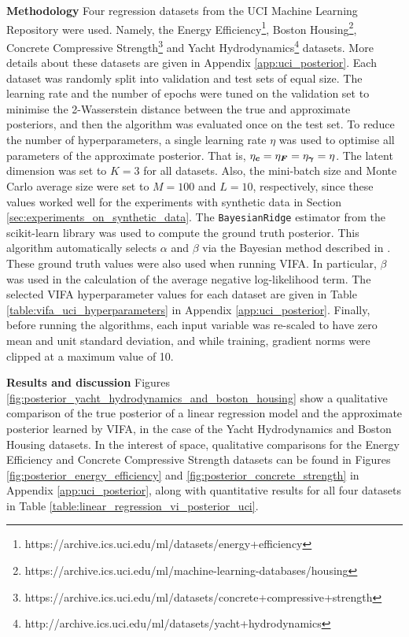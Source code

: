 \documentclass[10pt]{article} %
\newcommand{\vgamma}{\bm{\gamma}}
\begin{document}
\textbf{Methodology}  Four regression datasets from the UCI Machine Learning Repository \citep{dua2019} were used. Namely, the Energy Efficiency\footnote{https://archive.ics.uci.edu/ml/datasets/energy+efficiency}, Boston Housing\footnote{https://archive.ics.uci.edu/ml/machine-learning-databases/housing}, Concrete Compressive Strength\footnote{https://archive.ics.uci.edu/ml/datasets/concrete+compressive+strength} and Yacht Hydrodynamics\footnote{http://archive.ics.uci.edu/ml/datasets/yacht+hydrodynamics} datasets. More details about these datasets are given in Appendix \ref{app:uci_posterior}.  Each dataset was randomly split into validation and test sets of equal size. The learning rate and the number of epochs were tuned on the validation set to minimise the 2-Wasserstein distance between the true and approximate posteriors, and then the algorithm was evaluated once on the test set. To reduce the number of hyperparameters, a single learning rate $\eta$ was used to optimise all parameters of the approximate posterior. That is, $\eta_\vc = \eta_\mF = \eta_{\vgamma} = \eta$. The latent dimension was set to $K=3$ for all datasets. Also, the mini-batch size and Monte Carlo average size were set to $M=100$ and $L=10$, respectively, since these values worked well for the experiments with synthetic data in Section \ref{sec:experiments_on_synthetic_data}. The \texttt{BayesianRidge} estimator from the scikit-learn library \citep{pedregosa2012} was used to compute the ground truth posterior. This algorithm automatically selects $\alpha$ and $\beta$ via the Bayesian method described in \citep{mackay1992}. These ground truth values were also used when running VIFA. In particular, $\beta$ was used in the calculation of the average negative log-likelihood term. The selected VIFA hyperparameter values for each dataset are given in Table \ref{table:vifa_uci_hyperparameters} in Appendix \ref{app:uci_posterior}. Finally, before running the algorithms, each input variable was re-scaled to have zero mean and unit standard deviation, and while training, gradient norms were clipped at a maximum value of 10. 


\textbf{Results and discussion}
Figures \ref{fig:posterior_yacht_hydrodynamics_and_boston_housing} show a qualitative comparison of the true posterior of a linear regression model and the approximate posterior learned by VIFA, in the case of the Yacht Hydrodynamics and Boston Housing datasets. In the interest of space, qualitative comparisons for the Energy Efficiency and Concrete Compressive Strength datasets can be found in Figures \ref{fig:posterior_energy_efficiency} and \ref{fig:posterior_concrete_strength} in Appendix \ref{app:uci_posterior}, along with quantitative results for all four datasets in Table \ref{table:linear_regression_vi_posterior_uci}.
\end{document}
